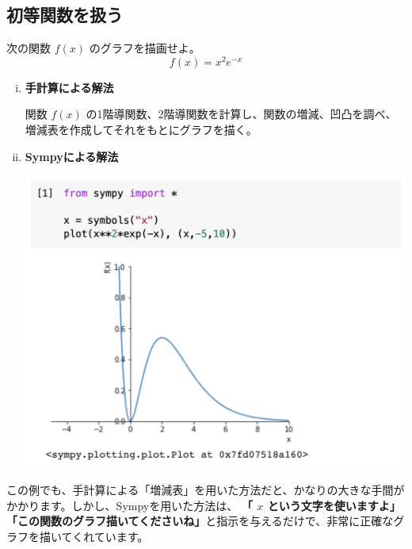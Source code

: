 \documentclass[9pt, a5paper,dvipdfmx]{jsbook}
\begin{document}
\subsection{初等関数を扱う}
\begin{framed}
\begin{exq}
次の関数
\large
$f(x)$
\normalsize
のグラフを描画せよ。
\Large
$$f(x) = x^2e^{-x}$$
\normalsize
\end{exq}
\end{framed}
\begin{enumerate}[(i)]
    \item 
    {\bf 手計算による解法}
    
関数
\large
$f(x)$
\normalsize
の1階導関数、2階導関数を計算し、関数の増減、凹凸を調べ、増減表を作成してそれをもとにグラフを描く。\\
    \item
    {\bf Sympyによる解法}
    \begin{center}
    \includegraphics[scale=0.5]{fig1-2-2.png}
    \end{center}    
\end{enumerate}
この例でも、手計算による「増減表」を用いた方法だと、かなりの大きな手間がかかります。しかし、Sympyを用いた方法は、
{\bf 「\large 
{$x$}
\normalsize
という文字を使いますよ」}
{\bf 「この関数のグラフ描いてくださいね」}と指示を与えるだけで、非常に正確なグラフを描いてくれています。
\end{document}
